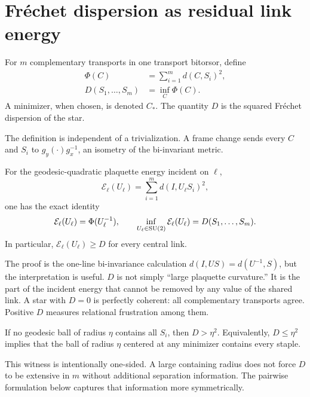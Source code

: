 \section{Fr\'echet dispersion as residual link energy}
\label{sec:frechet}

\begin{definition}
For $m$ complementary transports in one transport bitorsor, define
\begin{align}
 \Phi(C)&=\sum_{i=1}^m d(C,S_i)^2,\\
 D(S_1,\ldots,S_m)&=\inf_C\Phi(C).
\end{align}
A minimizer, when chosen, is denoted $C_*$.  The quantity $D$ is the squared
Fr\'echet dispersion of the star.
\end{definition}

The definition is independent of a trivialization.  A frame change sends
every $C$ and $S_i$ to $g_y(\cdot)g_x^{-1}$, an isometry of the bi-invariant
metric.

\begin{theorem}
\label{thm:residual}
For the geodesic-quadratic plaquette energy incident on $\ell$,
\[
  \mathcal E_\ell(U_\ell)=\sum_{i=1}^m d(I,U_\ell S_i)^2,
\]
one has the exact identity
\[
  \mathcal E_\ell(U_\ell)=\Phi(U_\ell^{-1}),
  \qquad
  \inf_{U_\ell\in\mathrm{SU}(2)}\mathcal E_\ell(U_\ell)=D(S_1,\ldots,S_m).
\]
In particular, $\mathcal E_\ell(U_\ell)\ge D$ for every central link.
\end{theorem}

The proof is the one-line bi-invariance calculation
$d(I,US)=d(U^{-1},S)$, but the interpretation is useful.  $D$ is not simply
``large plaquette curvature.''  It is the part of the incident energy that
cannot be removed by any value of the shared link.  A star with $D=0$ is
perfectly coherent: all complementary transports agree.  Positive $D$
measures relational frustration among them.

\begin{corollary}
If no geodesic ball of radius $\eta$ contains all $S_i$, then $D>\eta^2$.
Equivalently, $D\le\eta^2$ implies that the ball of radius $\eta$ centered at
any minimizer contains every staple.
\end{corollary}

This witness is intentionally one-sided.  A large containing radius does not
force $D$ to be extensive in $m$ without additional separation information.
The pairwise formulation below captures that information more symmetrically.
